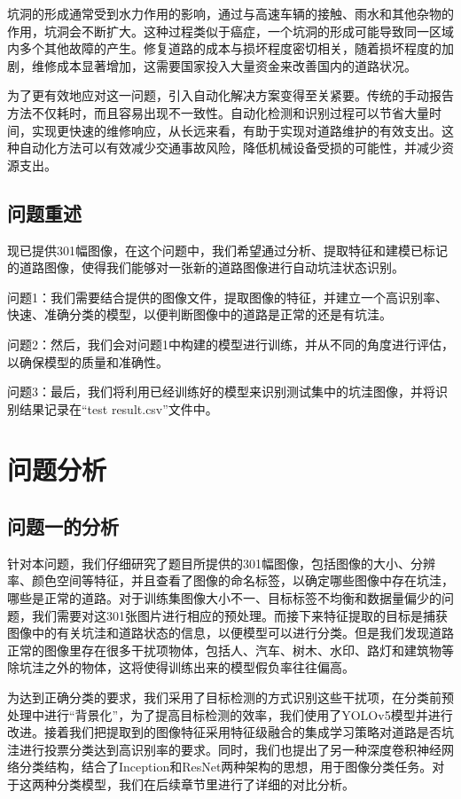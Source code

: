 \documentclass[a4paper, 10pt]{article}
\begin{document}
	坑洞的形成通常受到水力作用的影响，通过与高速车辆的接触、雨水和其他杂物的作用，坑洞会不断扩大。这种过程类似于癌症，一个坑洞的形成可能导致同一区域内多个其他故障的产生。修复道路的成本与损坏程度密切相关，随着损坏程度的加剧，维修成本显著增加，这需要国家投入大量资金来改善国内的道路状况。
	
	为了更有效地应对这一问题，引入自动化解决方案变得至关紧要。传统的手动报告方法不仅耗时，而且容易出现不一致性。自动化检测和识别过程可以节省大量时间，实现更快速的维修响应，从长远来看，有助于实现对道路维护的有效支出。这种自动化方法可以有效减少交通事故风险，降低机械设备受损的可能性，并减少资源支出。
	
	\subsection{问题重述}
	现已提供301幅图像，在这个问题中，我们希望通过分析、提取特征和建模已标记的道路图像，使得我们能够对一张新的道路图像进行自动坑洼状态识别。
	
	问题1：我们需要结合提供的图像文件，提取图像的特征，并建立一个高识别率、快速、准确分类的模型，以便判断图像中的道路是正常的还是有坑洼。
	
	问题2：然后，我们会对问题1中构建的模型进行训练，并从不同的角度进行评估，以确保模型的质量和准确性。
	
	问题3：最后，我们将利用已经训练好的模型来识别测试集中的坑洼图像，并将识别结果记录在“test result.csv”文件中。
	
	\section{问题分析}
	
	\subsection{问题一的分析}
	
	针对本问题，我们仔细研究了题目所提供的301幅图像，包括图像的大小、分辨率、颜色空间等特征，并且查看了图像的命名标签，以确定哪些图像中存在坑洼，哪些是正常的道路。对于训练集图像大小不一、目标标签不均衡和数据量偏少的问题，我们需要对这301张图片进行相应的预处理。而接下来特征提取的目标是捕获图像中的有关坑洼和道路状态的信息，以便模型可以进行分类。但是我们发现道路正常的图像里存在很多干扰项物体，包括人、汽车、树木、水印、路灯和建筑物等除坑洼之外的物体，这将使得训练出来的模型假负率往往偏高。
	
	为达到正确分类的要求，我们采用了目标检测的方式识别这些干扰项，在分类前预处理中进行“背景化”，为了提高目标检测的效率，我们使用了YOLOv5模型并进行改进。接着我们把提取到的图像特征采用特征级融合的集成学习策略对道路是否坑洼进行投票分类达到高识别率的要求。同时，我们也提出了另一种深度卷积神经网络分类结构，结合了Inception和ResNet两种架构的思想，用于图像分类任务。对于这两种分类模型，我们在后续章节里进行了详细的对比分析。
	
\end{document}
